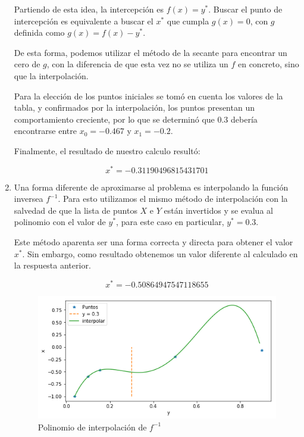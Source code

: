 \documentclass[spanish, fleqn]{article}
\begin{document}
\begin{enumerate}
	Partiendo de esta idea, la intercepción es $f(x) = y^*$. Buscar el punto de intercepción es equivalente a buscar el $x^*$ que cumpla $g(x) = 0$, con $g$ definida como $g(x) = f(x) - y^*$.
	
	De esta forma, podemos utilizar el método de la secante para encontrar un cero de $g$, con la diferencia de que esta vez no se utiliza un $f$ en concreto, sino que la interpolación.
  
	Para la elección de los puntos iniciales se tomó en cuenta los valores de la tabla, y confirmados por la interpolación, los puntos presentan un comportamiento creciente, por lo que se determinó que $0.3$ debería encontrarse entre $x_0 = -0.467$ y $x_1=-0.2$.
	
  
	Finalmente, el resultado de nuestro calculo resultó:
	
		$$x^* = -0.31190496815431701$$  
  
  \item %
  
  Una forma diferente de aproximarse al problema es interpolando la función inversea $f^{-1}$. Para esto utilizamos el mismo método de interpolación con la salvedad de que la lista de puntos $X$ e $Y$ están invertidos y se evalua al polinomio con el valor de $y^*$, para este caso en particular, $y^* = 0.3$.
  
  Este método aparenta ser una forma correcta y directa para obtener el valor $x^*$. Sin embargo, como resultado obtenemos un valor diferente al calculado en la respuesta anterior.
  
  $$x^* = -0.50864947547118655$$
  
   \begin{figure}[h]
	\caption{Polinomio de interpolación de $f^{-1}$}   
	\centering
 	\includegraphics[scale=0.6]{interpolacioninversa.png}
   \end{figure}
  

\end{enumerate}
\end{document}
